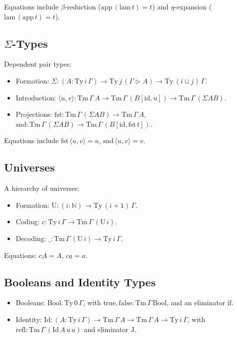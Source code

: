 \documentclass{article}
\begin{document}
Equations include \(\beta\)-reduction (\(\mathrm{app}\, (\mathrm{lam}\, t) = t\)) and \(\eta\)-expansion (\(\mathrm{lam}\, (\mathrm{app}\, t) = t\)).

\subsection{\(\Sigma\)-Types}
Dependent pair types:
\begin{itemize}
    \item Formation: \(\Sigma : (A : \mathrm{Ty}\, i\, \Gamma) \to \mathrm{Ty}\, j\, (\Gamma \triangleright A) \to \mathrm{Ty}\, (i \sqcup j)\, \Gamma\).
    \item Introduction: \(\langle u, v \rangle : \mathrm{Tm}\, \Gamma\, A \to \mathrm{Tm}\, \Gamma\, (B[\mathrm{id}, u]) \to \mathrm{Tm}\, \Gamma\, (\Sigma A B)\).
    \item Projections: \(\mathrm{fst} : \mathrm{Tm}\, \Gamma\, (\Sigma A B) \to \mathrm{Tm}\, \Gamma\, A\), \(\mathrm{snd} : \mathrm{Tm}\, \Gamma\, (\Sigma A B) \to \mathrm{Tm}\, \Gamma\, (B[\mathrm{id}, \mathrm{fst}\, t])\).
\end{itemize}

Equations include \(\mathrm{fst}\, \langle u, v \rangle = u\), \(\mathrm{snd}\, \langle u, v \rangle = v\).

\subsection{Universes}
A hierarchy of universes:
\begin{itemize}
    \item Formation: \(\mathrm{U} : (i : \mathbb{N}) \to \mathrm{Ty}\, (i+1)\, \Gamma\).
    \item Coding: \(c : \mathrm{Ty}\, i\, \Gamma \to \mathrm{Tm}\, \Gamma\, (\mathrm{U}\, i)\).
    \item Decoding: \(\_ : \mathrm{Tm}\, \Gamma\, (\mathrm{U}\, i) \to \mathrm{Ty}\, i\, \Gamma\).
\end{itemize}

Equations: \(\underline{c A} = A\), \(c \underline{a} = a\).

\subsection{Booleans and Identity Types}
\begin{itemize}
    \item Booleans: \(\mathrm{Bool} : \mathrm{Ty}\, 0\, \Gamma\), with \(\mathrm{true}, \mathrm{false} : \mathrm{Tm}\, \Gamma\, \mathrm{Bool}\), and an eliminator \(\mathrm{if}\).
    \item Identity: \(\mathrm{Id} : (A : \mathrm{Ty}\, i\, \Gamma) \to \mathrm{Tm}\, \Gamma\, A \to \mathrm{Tm}\, \Gamma\, A \to \mathrm{Ty}\, i\, \Gamma\), with \(\mathrm{refl} : \mathrm{Tm}\, \Gamma\, (\mathrm{Id}\, A\, u\, u)\) and eliminator \(\mathrm{J}\).
\end{itemize}
\end{document}
